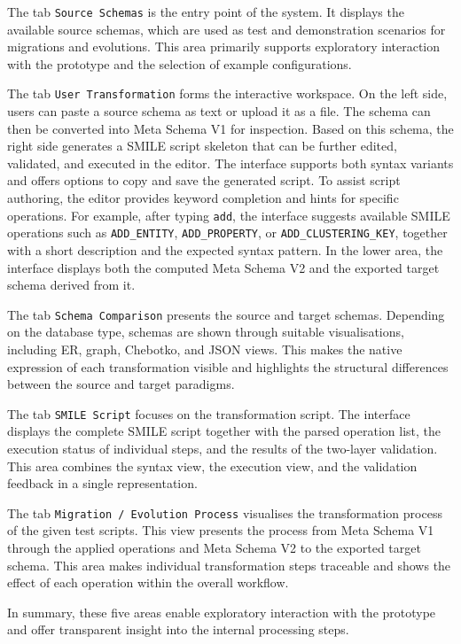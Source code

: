 The tab \texttt{Source Schemas} is the entry point of the system. It displays the available source schemas, which are used as test and demonstration scenarios for migrations and evolutions. This area primarily supports exploratory interaction with the prototype and the selection of example configurations.

The tab \texttt{User Transformation} forms the interactive workspace. On the left side, users can paste a source schema as text or upload it as a file. The schema can then be converted into Meta Schema V1 for inspection. Based on this schema, the right side generates a \textsc{SMILE} script skeleton that can be further edited, validated, and executed in the editor. The interface supports both syntax variants and offers options to copy and save the generated script. To assist script authoring, the editor provides keyword completion and hints for specific operations. For example, after typing \texttt{add}, the interface suggests available \textsc{SMILE} operations such as \texttt{ADD\_ENTITY}, \texttt{ADD\_PROPERTY}, or \texttt{ADD\_CLUSTERING\_KEY}, together with a short description and the expected syntax pattern. In the lower area, the interface displays both the computed Meta Schema V2 and the exported target schema derived from it.

The tab \texttt{Schema Comparison} presents the source and target schemas. Depending on the database type, schemas are shown through suitable visualisations, including ER, graph, Chebotko, and JSON views. This makes the native expression of each transformation visible and highlights the structural differences between the source and target paradigms.

The tab \texttt{SMILE Script} focuses on the transformation script. The interface displays the complete \textsc{SMILE} script together with the parsed operation list, the execution status of individual steps, and the results of the two-layer validation. This area combines the syntax view, the execution view, and the validation feedback in a single representation.

The tab \texttt{Migration / Evolution Process} visualises the transformation process of the given test scripts. This view presents the process from Meta Schema V1 through the applied operations and Meta Schema V2 to the exported target schema. This area makes individual transformation steps traceable and shows the effect of each operation within the overall workflow.

In summary, these five areas enable exploratory interaction with the prototype and offer transparent insight into the internal processing steps.

